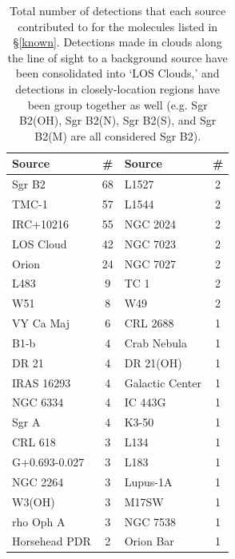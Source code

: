 \begin{table}[htb!]
\centering
\caption{Total number of detections that each source contributed to for the molecules listed in \S\ref{known}.  Detections made in clouds along the line of sight to a background source have been consolidated into `LOS Clouds,' and detections in closely-location regions have been group together as well (e.g. Sgr B2(OH), Sgr B2(N), Sgr B2(S), and Sgr B2(M) are all considered Sgr B2).}
\begin{tabular*}{\columnwidth}{l @{\extracolsep{\fill}}  c @{\extracolsep{\fill}}  l @{\extracolsep{\fill}}  c }
\hline\hline
Source	&	\# 	&	Source	&	\# \\
\hline
Sgr B2	&	68	&	L1527	&	2	\\
TMC-1	&	57	&	L1544	&	2	\\
IRC+10216	&	55	&	NGC 2024	&	2	\\
LOS Cloud	&	42	&	NGC 7023	&	2	\\
Orion	&	24	&	NGC 7027	&	2	\\
L483	&	9	&	TC 1	&	2	\\
W51	&	8	&	W49	&	2	\\
VY Ca Maj	&	6	&	CRL 2688	&	1	\\
B1-b	&	4	&	Crab Nebula	&	1	\\
DR 21	&	4	&	DR 21(OH)	&	1	\\
IRAS 16293	&	4	&	Galactic Center	&	1	\\
NGC 6334	&	4	&	IC 443G	&	1	\\
Sgr A	&	4	&	K3-50	&	1	\\
CRL 618	&	3	&	L134	&	1	\\
G+0.693-0.027	&	3	&	L183	&	1	\\
NGC 2264	&	3	&	Lupus-1A	&	1	\\
W3(OH)	&	3	&	M17SW	&	1	\\
rho Oph A	&	3	&	NGC 7538	&	1	\\
Horsehead PDR	&	2	&	Orion Bar	&	1	\\
\hline
\end{tabular*}
\label{detects_by_source}
\end{table}\endinput